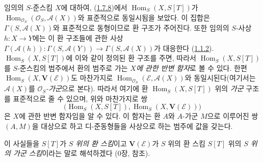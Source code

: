 \begin{env}[1.7.13]
\label{II.1.7.13-ko}
임의의 $S$-준스킴 $X$에 대하여,
(\hyperref[II.1.7.8-ko]{1.7.8})에서
$\operatorname{Hom}_S(X,S[T])$가
$\operatorname{Hom}_{\mathcal{O}_S}(\mathcal{O}_S,\mathcal{A}(X))$와
표준적으로 동일시됨을 보았다. 이 집합은
$\Gamma(S,\mathcal{A}(X))$와 표준적으로 동형이므로 환 구조가 주어진다.
또한 임의의 $S$-사상 $h:X\to Y$에는 이 환 구조들에 관한 사상
$\Gamma(\mathcal{A}(h)):\Gamma(S,\mathcal{A}(Y))
\to\Gamma(S,\mathcal{A}(X))$가 대응한다
(\hyperref[II.1.1.2-ko]{1.1.2}).
$\operatorname{Hom}_S(X,S[T])$에 이와 같이 정의된 환 구조를 주면,
따라서 $\operatorname{Hom}_S(X,S[T])$를 $S$-준스킴의 범주에서 환의
범주로 가는 \emph{$X$에 관한 반변 함자}로 볼 수 있다.
한편 $\operatorname{Hom}_S(X,\mathbf{V}(\mathcal{E}))$도 마찬가지로
$\operatorname{Hom}_{\mathcal{O}_S}(\mathcal{E},\mathcal{A}(X))$와
동일시된다(여기서는 $\mathcal{A}(X)$를
\emph{$\mathcal{O}_S$-가군}으로 본다). 따라서 여기에 환
$\operatorname{Hom}_S(X,S[T])$ 위의 \emph{가군} 구조를 표준적으로
줄 수 있으며, 위와 마찬가지로 쌍
\[
  \bigl(\operatorname{Hom}_S(X,S[T]),
  \operatorname{Hom}_S(X,\mathbf{V}(\mathcal{E}))\bigr)
\]
은 $X$에 관한 반변 함자임을 알 수 있다. 이 함자는 환 $A$와
$A$-가군 $M$으로 이루어진 쌍 $(A,M)$을 대상으로 하고 디-준동형들을
사상으로 하는 범주에 값을 갖는다.

이 사실들을 $S[T]$가 \emph{$S$ 위의 환 스킴}이고
$\mathbf{V}(\mathcal{E})$가 $S$ 위의 환 스킴 $S[T]$ 위의
\emph{$S$ 위의 가군 스킴}이라는 말로 해석하겠다
(0장,  참조).
\end{env}

